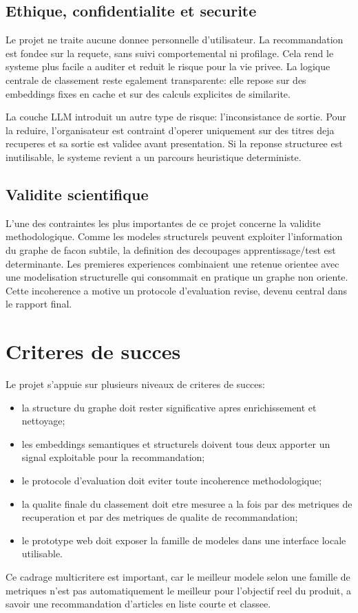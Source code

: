 \subsection{Ethique, confidentialite et securite}

Le projet ne traite aucune donnee personnelle d'utilisateur. La recommandation
est fondee sur la requete, sans suivi comportemental ni profilage. Cela rend le
systeme plus facile a auditer et reduit le risque pour la vie privee. La
logique centrale de classement reste egalement transparente: elle repose sur
des embeddings fixes en cache et sur des calculs explicites de similarite.

La couche LLM introduit un autre type de risque: l'inconsistance de sortie.
Pour la reduire, l'organisateur est contraint d'operer uniquement sur des
titres deja recuperes et sa sortie est validee avant presentation. Si la
reponse structuree est inutilisable, le systeme revient a un parcours
heuristique deterministe.

\subsection{Validite scientifique}

L'une des contraintes les plus importantes de ce projet concerne la validite
methodologique. Comme les modeles structurels peuvent exploiter l'information du
graphe de facon subtile, la definition des decoupages apprentissage/test est
determinante. Les premieres experiences combinaient une retenue orientee avec
une modelisation structurelle qui consommait en pratique un graphe non oriente.
Cette incoherence a motive un protocole d'evaluation revise, devenu central
dans le rapport final.

\section{Criteres de succes}

Le projet s'appuie sur plusieurs niveaux de criteres de succes:
\begin{itemize}
    \item la structure du graphe doit rester significative apres enrichissement
    et nettoyage;
    \item les embeddings semantiques et structurels doivent tous deux apporter
    un signal exploitable pour la recommandation;
    \item le protocole d'evaluation doit eviter toute incoherence
    methodologique;
    \item la qualite finale du classement doit etre mesuree a la fois par des
    metriques de recuperation et par des metriques de qualite de recommandation;
    \item le prototype web doit exposer la famille de modeles dans une
    interface locale utilisable.
\end{itemize}

Ce cadrage multicritere est important, car le meilleur modele selon une famille
de metriques n'est pas automatiquement le meilleur pour l'objectif reel du
produit, a savoir une recommandation d'articles en liste courte et classee.
